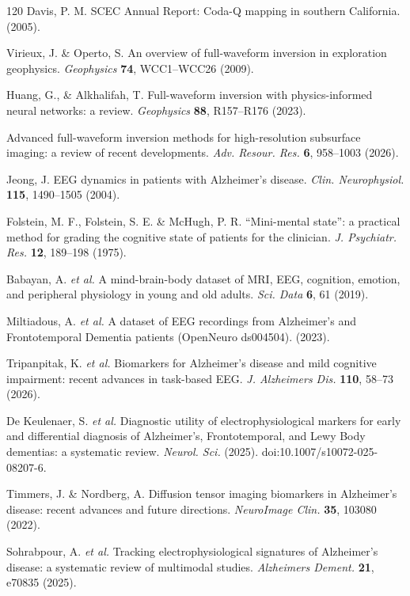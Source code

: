 \documentclass[twocolumn, 10pt]{article}
\begin{document}
\begin{thebibliography}{120}
 Davis, P. M. SCEC Annual Report: Coda-Q mapping in southern California. (2005).

 Virieux, J. \& Operto, S. An overview of full-waveform inversion in exploration geophysics. \emph{Geophysics} \textbf{74}, WCC1--WCC26 (2009).

 Huang, G., \& Alkhalifah, T. Full-waveform inversion with physics-informed neural networks: a review. \emph{Geophysics} \textbf{88}, R157--R176 (2023).

 Advanced full-waveform inversion methods for high-resolution subsurface imaging: a review of recent developments. \emph{Adv. Resour. Res.} \textbf{6}, 958--1003 (2026).

 Jeong, J. EEG dynamics in patients with Alzheimer's disease. \emph{Clin. Neurophysiol.} \textbf{115}, 1490--1505 (2004).

 Folstein, M. F., Folstein, S. E. \& McHugh, P. R. ``Mini-mental state'': a practical method for grading the cognitive state of patients for the clinician. \emph{J. Psychiatr. Res.} \textbf{12}, 189--198 (1975).

 Babayan, A. \emph{et al.} A mind-brain-body dataset of MRI, EEG, cognition, emotion, and peripheral physiology in young and old adults. \emph{Sci. Data} \textbf{6}, 61 (2019).

 Miltiadous, A. \emph{et al.} A dataset of EEG recordings from Alzheimer's and Frontotemporal Dementia patients (OpenNeuro ds004504). (2023).

 Tripanpitak, K. \emph{et al.} Biomarkers for Alzheimer's disease and mild cognitive impairment: recent advances in task-based EEG. \emph{J. Alzheimers Dis.} \textbf{110}, 58--73 (2026).

 De Keulenaer, S. \emph{et al.} Diagnostic utility of electrophysiological markers for early and differential diagnosis of Alzheimer's, Frontotemporal, and Lewy Body dementias: a systematic review. \emph{Neurol. Sci.} (2025). doi:10.1007/s10072-025-08207-6.

 Timmers, J. \& Nordberg, A. Diffusion tensor imaging biomarkers in Alzheimer's disease: recent advances and future directions. \emph{NeuroImage Clin.} \textbf{35}, 103080 (2022).

 Sohrabpour, A. \emph{et al.} Tracking electrophysiological signatures of Alzheimer's disease: a systematic review of multimodal studies. \emph{Alzheimers Dement.} \textbf{21}, e70835 (2025).


\end{thebibliography}
\end{document}
